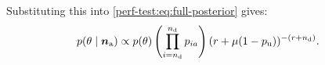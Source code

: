\documentclass[thesis.tex]{subfiles}
\begin{document}
Substituting this into \cref{perf-test:eq:full-posterior} gives:
\begin{align}
p(\theta \mid \bm{n_\text{a}})
&\propto p(\theta) \left( \prod_{i=n_\text{d}}^{n_\text{d}} p_{ia} \right) (r + \mu (1- p_\text{u}))^{-(r+n_\text{d})} \label{perf-test:eq:full-posterior-simplified}.
\end{align}

\end{document}
